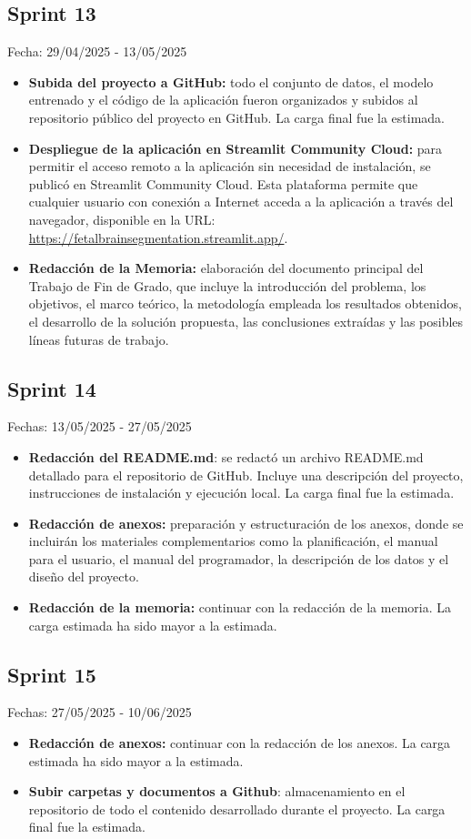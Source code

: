 \subsection{Sprint 13}
Fecha: 29/04/2025 - 13/05/2025
\begin{itemize}
     \item \textbf{Subida del proyecto a GitHub:} todo el conjunto de datos, el modelo entrenado y el código de la aplicación fueron organizados y subidos al repositorio público del proyecto en GitHub. La carga final fue la estimada. 
     \item \textbf{Despliegue de la aplicación en Streamlit Community Cloud:} para permitir el acceso remoto a la aplicación sin necesidad de instalación, se publicó en Streamlit Community Cloud. Esta plataforma permite que cualquier usuario con conexión a Internet acceda a la aplicación a través del navegador, disponible en la URL: \url{https://fetalbrainsegmentation.streamlit.app/}.
     \item \textbf{Redacción de la Memoria:} elaboración del documento principal del Trabajo de Fin de Grado, que incluye la introducción del problema, los objetivos, el marco teórico, la metodología empleada los resultados obtenidos, el desarrollo de la solución propuesta, las conclusiones extraídas y las posibles líneas futuras de trabajo.
\end{itemize}

\subsection{Sprint 14}
Fechas: 13/05/2025 - 27/05/2025
\begin{itemize}
     \item \textbf{Redacción del README.md}: se redactó un archivo README.md detallado para el repositorio de GitHub. Incluye una descripción del proyecto, instrucciones de instalación y ejecución local. La carga final fue la estimada.
    \item \textbf{Redacción de anexos:} preparación y estructuración de los anexos, donde se incluirán los materiales complementarios como  la planificación, el manual para el usuario, el manual del programador, la descripción de los datos y el diseño del proyecto.
    \item \textbf{Redacción de la memoria:} continuar con la redacción de la memoria. La carga estimada ha sido mayor a la estimada.
\end{itemize}

\subsection{Sprint 15}
Fechas: 27/05/2025 - 10/06/2025
\begin{itemize}
    \item \textbf{Redacción de anexos:} continuar con la redacción de los anexos. La carga estimada ha sido mayor a la estimada.
    \item \textbf{Subir carpetas y documentos a Github}: almacenamiento en el repositorio de todo el contenido desarrollado durante el proyecto. La carga final fue la estimada.
\end{itemize}



